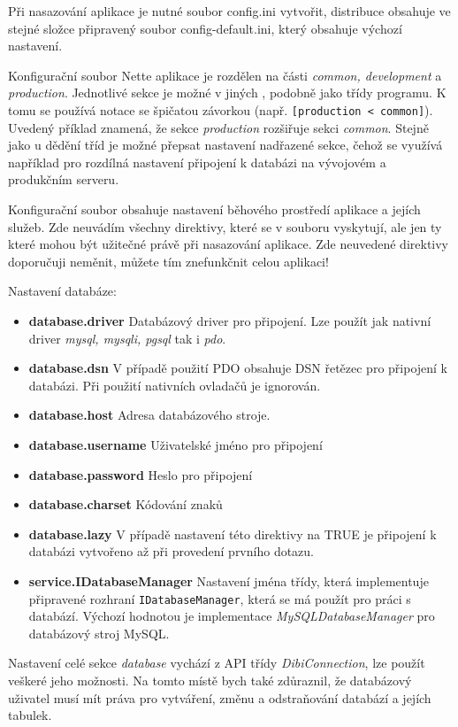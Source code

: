 \documentclass[11pt,twoside,a4paper]{book}
\begin{document}
Při nasazování aplikace je nutné soubor config.ini vytvořit, distribuce obsahuje ve stejné složce připravený soubor config-default.ini, který obsahuje výchozí nastavení.

Konfigurační soubor Nette aplikace je rozdělen na části \textit{common, development} a \textit{production}. Jednotlivé sekce je možné v jiných , podobně jako třídy programu. K tomu se používá notace se špičatou závorkou (např. \texttt{[production < common]}). Uvedený příklad znamená, že sekce \textit{production} rozšiřuje sekci \textit{common}. Stejně jako u dědění tříd je možné přepsat nastavení nadřazené sekce, čehož se využívá například pro rozdílná nastavení připojení k databázi na vývojovém a produkčním serveru.

Konfigurační soubor obsahuje nastavení běhového prostředí aplikace a jejích služeb. Zde neuvádím všechny direktivy, které se v souboru vyskytují, ale jen ty které mohou být užitečné právě při nasazování aplikace. Zde neuvedené direktivy doporučuji neměnit, můžete tím znefunkčnit celou aplikaci!

Nastavení databáze:
\begin{itemize}
\item \textbf{database.driver} Databázový driver pro připojení. Lze použít jak nativní driver \textit{mysql, mysqli, pgsql} tak i \textit{pdo}.
\item \textbf{database.dsn} V případě použití PDO obsahuje DSN řetězec pro připojení k databázi. Při použití nativních ovladačů je ignorován.
\item \textbf{database.host} Adresa databázového stroje.
\item \textbf{database.username} Uživatelské jméno pro připojení
\item \textbf{database.password} Heslo pro připojení
\item \textbf{database.charset} Kódování znaků
\item \textbf{database.lazy} V případě nastavení této direktivy na TRUE je připojení k databázi vytvořeno až při provedení prvního dotazu.
\item \textbf{service.IDatabaseManager} Nastavení jména třídy, která implementuje připravené rozhraní \texttt{IDatabaseManager}, která se má použít pro práci s databází. Výchozí hodnotou je implementace \textit{MySQLDatabaseManager} pro databázový stroj MySQL.
\end{itemize}
Nastavení celé sekce \textit{database} vychází z API třídy \textit{DibiConnection}\cite{dibiconnection}, lze použít veškeré jeho možnosti. Na tomto místě bych také zdůraznil, že databázový uživatel musí mít práva pro vytváření, změnu a odstraňování databází a jejích tabulek.
\end{document}
